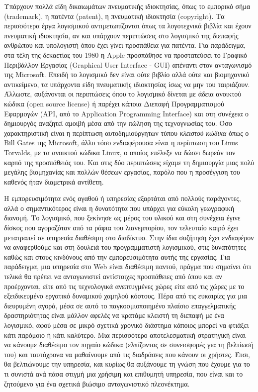 \documentclass[
]{article}
\begin{document}
Υπάρχουν πολλά είδη δικαιωμάτων πνευματικής ιδιοκτησίας, όπως το
εμπορικό σήμα (trademark), η πατέντα (patent), η πνευματική ιδιοκτησία
(copyright). Τα περισσότερα έργα λογισμικού αντιμετωπίζονται όπως τα
λογοτεχνικά βιβλία και έχουν πνευματική ιδιοκτησία, αν και υπάρχουν
περιπτώσεις στο λογισμικό της διεπαφής ανθρώπου και υπολογιστή όπου έχει
γίνει προσπάθεια για πατέντα. Για παράδειγμα, στα τέλη της δεκαετίας του
1980 η Apple προσπάθησε να προστατεύσει το Γραφικό Περιβάλλον Εργασίας
(Graphical User Interface - GUI) απέναντι στον ανταγωνισμό της
Microsoft. Επειδή το λογισμικό δεν είναι ούτε βιβλίο αλλά ούτε και
βιομηχανικό αντικείμενο, τα υπάρχοντα είδη πνευματικής ιδιοκτησίας ίσως
να μην του ταιριάζουν. Άλλωστε, αυξάνονται οι περιπτώσεις όπου το
λογισμικό δίνεται με άδεια ανοικτού κώδικα (open source license) ή
παρέχει κάποια Διεπαφή Προγραμματισμού Εφαρμογών (API, από το
Application Programming Interface) και στη συνέχεια ο δημιουργός
αναζητεί αμοιβή μέσα από την πώληση της τεχνογνωσίας του. Όσο
χαρακτηριστική είναι η περίπτωση αυτοδημιούργητων τύπου \emph{κλειστού
κώδικα} όπως ο Bill Gates της Microsoft, άλλο τόσο ενδιαφέρουσα είναι η
περίπτωση του Linus Torvalds, με τα ανοικτού κώδικα Linux, ο οποίος
επέλεξε να δώσει δωρεάν τον καρπό της προσπάθειάς του. Και στις δύο
περιπτώσεις είχαμε τη δημιουργία μιας πολύ μεγάλης βιομηχανίας και
πολλών θέσεων εργασίας, παρόλο που η προσέγγιση του καθενός ήταν
διαμετρικά αντίθετη.

Η εμπορευσιμότητα ενός αγαθού ή υπηρεσίας εξαρτάται από πολλούς
παράγοντες, αλλά ο σημαντικότερος είναι η δυνατότητα που υπάρχει για
εύκολη γεωγραφική διανομή. Το λογισμικό, που ξεκίνησε ως μέρος του
υλικού και στη συνέχεια έγινε δίσκος που αγοραζόταν από τα ράφια του
λιανεμπορίου, τον τελευταίο καιρό έχει μετατραπεί σε υπηρεσία διαθέσιμη
στο διαδίκτυο. Στην ίδια συζήτηση έχει ενδιαφέρον να αναφερθούμε και στη
δουλειά του προγραμματιστή λογισμικού, στις δυνατότητες καθώς και στους
κινδύνους από την εμπορευσιμότητα αυτής της εργασίας. Για παράδειγμα,
μια υπηρεσία στο Web είναι διαθέσιμη παντού, πράγμα που σημαίνει ότι
τελικά θα πρέπει να ανταγωνιστεί αντίστοιχες προσπάθειες από όπου και αν
προέρχονται, είτε από τις τεχνολογικά ανεπτυγμένες χώρες είτε από τις
χώρες με το εξειδικευμένο εργατικό δυναμικού χαμηλού κόστους. Πέρα από
τις ευκαιρίες για μια διευρυμένη αγορά, μέσα σε αυτό το
παγκοσμιοποιημένο πλαίσιο επαγγελματικής δραστηριότητας είναι μάλλον
αφελές να κρατάμε κλειστή τη διεπαφή με ένα λογισμικό, αφού μέσα σε
μικρό σχετικά χρονικό διάστημα κάποιος μπορεί να φτιάξει κάτι παρόμοιο ή
κάτι καλύτερο. Μια περισσότερο αποτελεσματική στρατηγική είναι να
κάνουμε διαθέσιμο τον πηγαίο κώδικα (ελπίζοντας σε συνεισφορές για τη
βελτίωσή του) και ταυτόχρονα να μαθαίνουμε από τις διαδράσεις που κάνουν
οι χρήστες. Έτσι, θα βελτιώνουμε την υπηρεσία, και κυρίως θα αυξάνουμε
τη γνώση που έχουμε για το τι συνιστά ανά πάσα στιγμή μια χρήσιμη και
επιθυμητή υπηρεσία, που είναι και το ζητούμενο για ένα σχετικά βιώσιμο
ανταγωνιστικό πλεονέκτημα.
\end{document}
